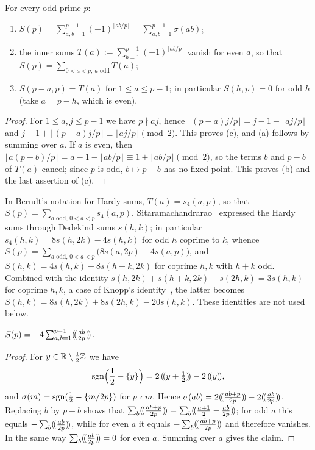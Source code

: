 \begin{lemma}\label{lem:elementary}
For every odd prime $p$:
\begin{enumerate}[label=\upshape(\alph*),leftmargin=*,nosep]
\item $S(p)=\sum_{a,b=1}^{p-1}(-1)^{\lfloor ab/p\rfloor}=\sum_{a,b=1}^{p-1}\sigma(ab)$;
\item the inner sums $T(a):=\sum_{b=1}^{p-1}(-1)^{\lfloor ab/p\rfloor}$ vanish for even $a$, so that $S(p)=\sum_{0<a<p,\ a\text{ odd}}T(a)$;
\item $S(p-a,p)=T(a)$ for $1\le a\le p-1$; in particular $S(h,p)=0$ for odd $h$ \textup{(}take $a=p-h$, which is even\textup{)}.
\end{enumerate}
\end{lemma}

\begin{proof}
For $1\le a,j\le p-1$ we have $p\nmid aj$, hence $\lfloor(p-a)j/p\rfloor=j-1-\lfloor aj/p\rfloor$ and $j+1+\lfloor(p-a)j/p\rfloor\equiv\lfloor aj/p\rfloor\pmod2$. This proves (c), and (a) follows by summing over $a$. If $a$ is even, then $\lfloor a(p-b)/p\rfloor=a-1-\lfloor ab/p\rfloor\equiv1+\lfloor ab/p\rfloor\pmod2$, so the terms $b$ and $p-b$ of $T(a)$ cancel; since $p$ is odd, $b\mapsto p-b$ has no fixed point. This proves (b) and the last assertion of (c).
\end{proof}

\begin{remark}\label{rem:hardy-dedekind}
In Berndt's notation for Hardy sums, $T(a)=s_4(a,p)$, so that $S(p)=\sum_{a\text{ odd},\,0<a<p}s_4(a,p)$. Sitaramachandrarao~\cite{b26} expressed the Hardy sums through Dedekind sums $s(h,k)$; in particular $s_4(h,k)=8s(h,2k)-4s(h,k)$ for odd $h$ coprime to $k$, whence $S(p)=\sum_{a\text{ odd},\,0<a<p}\bigl(8s(a,2p)-4s(a,p)\bigr)$, and $S(h,k)=4s(h,k)-8s(h+k,2k)$ for coprime $h,k$ with $h{+}k$ odd. Combined with the identity $s(h,2k){+}s(h{+}k,2k){+}s(2h,k)=3s(h,k)$ for coprime $h,k$, a case of Knopp's identity~\cite{b16}, the latter becomes $S(h,k)=8s(h,2k)+8s(2h,k)-20s(h,k)$. These identities are not used below.
\end{remark}

\begin{lemma}\label{lem:sawtooth}
$S(p)=-4\sum_{a,b=1}^{p-1}(\!(\frac{ab}{2p})\!)$.
\end{lemma}

\begin{proof}
For $y\in\mathbb{R}\setminus\frac12\mathbb{Z}$ we have
\begin{equation}\label{eq:sgn-sawtooth}
\operatorname{sgn}\Bigl(\frac12-\{y\}\Bigr)=2\,(\!(y+\tfrac12)\!)-2\,(\!(y)\!),
\end{equation}
and $\sigma(m)=\operatorname{sgn}(\frac12-\{m/2p\})$ for $p\nmid m$. Hence $\sigma(ab)=2(\!(\frac{ab+p}{2p})\!)-2(\!(\frac{ab}{2p})\!)$. Replacing $b$ by $p-b$ shows that $\sum_b(\!(\frac{ab+p}{2p})\!)=\sum_b(\!(\frac{a+1}2-\frac{ab}{2p})\!)$; for odd $a$ this equals $-\sum_b(\!(\frac{ab}{2p})\!)$, while for even $a$ it equals $-\sum_b(\!(\frac{ab+p}{2p})\!)$ and therefore vanishes. In the same way $\sum_b(\!(\frac{ab}{2p})\!)=0$ for even $a$. Summing over $a$ gives the claim.
\end{proof}

